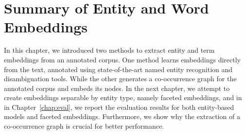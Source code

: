 \section{Summary of Entity and Word Embeddings}\label{sec:entity_summary}
In this chapter, we introduced two methods to extract entity and term embeddings from an annotated corpus. One method learns embeddings directly from the text, annotated using state-of-the-art named entity recognition and disambiguation tools. While the other generates a co-occurrence graph for the annotated corpus and embeds its nodes. In the next chapter, we attempt to create embeddings separable by entity type, namely faceted embeddings, and in in Chapter~\ref{chap:eval}, we report the evaluation results for both entity-based models and faceted embeddings. Furthermore, we show why the extraction of a co-occurrence graph is crucial for better performance. 
